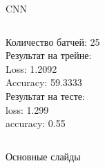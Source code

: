 \documentclass[c, aspectratio = 43]{beamer}
\begin{document}
\begin{frame}{CNN}
\begin{columns}
\begin{column}{0.5\textwidth}
                   
                   Количество батчей: 25\\
                   
                   
                   Результат на трейне:\\
                   Loss: 1.2092\\
                   Accuracy: 59.3333\\
                   
                   Результат на тесте:\\
                   loss: 1.299\\
                   accuracy: 0.55\\
                   
                \end{column}
               
                \end{columns}

            
            \end{frame}



\beamertemplatenavigationsymbolsempty
\begin{frame}[noframenumbering]{Основные слайды}
	\hypertarget{toc}{}
	\tableofcontents[part=1]
\end{frame}
\end{document}
